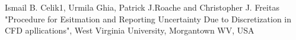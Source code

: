 \documentclass[paper=a4, fontsize=11pt, abstract=on]{scrartcl}
\numberwithin{equation}{section}		%
\numberwithin{figure}{section}			%
\numberwithin{table}{section}				%
\begin{document}
\begin{thebibliography}{99} %
Ismail B. Celik1, Urmila Ghia, Patrick J.Roache and Christopher J. Freitas
\newblock "Procedure for Esitmation and Reporting Uncertainty Due to Discretization in CFD apllications",  West Virginia University, Morgantown WV, USA

\end{thebibliography}


\end{document}
